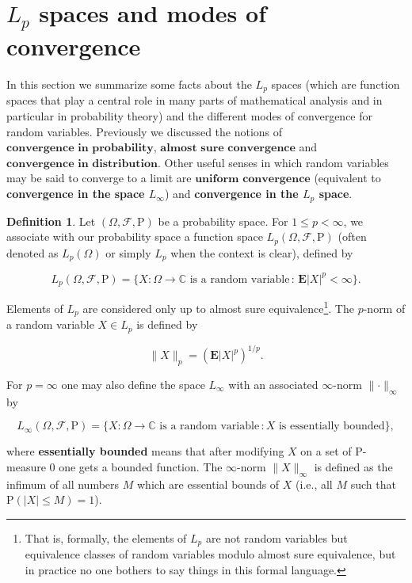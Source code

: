 \documentclass[11pt]{report}
\theoremstyle{plain}
\theoremstyle{definition}
\newtheorem{defn}[thm]{Definition}
\begin{document}
\section{$L_p$ spaces and modes of convergence}

In this section we summarize some facts about the
$L_p$ spaces (which are function spaces that play a
central role in many parts of mathematical analysis
and in particular in probability theory) and the
different modes of convergence for random variables.
Previously we discussed the notions of
$\textbf{convergence in probability}$,
$\textbf{almost sure convergence}$ and
$\textbf{convergence in distribution}$. Other useful
senses in which random variables may be said to
converge to a limit are $\textbf{uniform convergence}$
(equivalent to \textbf{convergence in the space $L_\infty$})
and \textbf{convergence in the $L_p$ space}.

\begin{defn}
Let $(\Omega, \mathcal{F}, \mathrm{P})$ be a
probability space. For $1\le p<\infty$, we associate
with our probability space a function space
$L_p(\Omega, \mathcal{F}, \mathrm{P})$ (often denoted
as $L_p(\Omega)$ or simply $L_p$ when the context is
clear), defined by

\[
L_p(\Omega, \mathcal{F}, \mathrm{P}) = \{ X:\Omega\to\mathbb{C}\textrm{ is a random variable}\,:\, \mathbf{E}|X|^p < \infty \}.
\]

\noindent Elements of $L_p$ are considered only up to almost
sure equivalence\footnote{That is, formally, the elements of $L_p$ are not
random variables but equivalence classes of random
variables modulo almost sure equivalence, but in
practice no one bothers to say things in this formal
language.}. The $p$-norm of a
random variable $X\in L_p$ is defined by

\[
\lVert X\rVert_p = \left( \mathbf{E} |X|^p\right)^{1/p}.
\]

\noindent For $p=\infty$ one may also define the space
$L_\infty$ with an associated $\infty$-norm
$\lVert\cdot\rVert_\infty$ by

\[
L_\infty(\Omega,\mathcal{F},\mathrm{P}) = \{ X:\Omega\to\mathbb{C}\textrm{ is a random variable}\,: X\textrm{ is essentially bounded} \},
\]

\noindent where \textbf{essentially bounded} means that after
modifying $X$ on a set of $\mathrm{P}$-measure $0$
one gets a bounded function. The $\infty$-norm
$\lVert X\rVert_\infty$ is defined as the infimum of
all numbers $M$ which are essential bounds of $X$
(i.e., all $M$ such that $\mathrm{P}(|X|\le M)=1$).
\end{defn}
\end{document}
